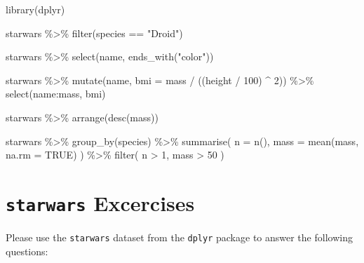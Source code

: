 \documentclass[
]{book}
\newenvironment{Shaded}{\begin{snugshade}}{\end{snugshade}}
\newcommand{\AttributeTok}[1]{\textcolor[rgb]{0.77,0.63,0.00}{#1}}
\newcommand{\ConstantTok}[1]{\textcolor[rgb]{0.00,0.00,0.00}{#1}}
\newcommand{\DecValTok}[1]{\textcolor[rgb]{0.00,0.00,0.81}{#1}}
\newcommand{\FunctionTok}[1]{\textcolor[rgb]{0.00,0.00,0.00}{#1}}
\newcommand{\NormalTok}[1]{#1}
\newcommand{\SpecialCharTok}[1]{\textcolor[rgb]{0.00,0.00,0.00}{#1}}
\newcommand{\StringTok}[1]{\textcolor[rgb]{0.31,0.60,0.02}{#1}}
\begin{document}
\begin{Shaded}
\begin{Highlighting}[]
\FunctionTok{library}\NormalTok{(dplyr)}

\NormalTok{starwars }\SpecialCharTok{\%\textgreater{}\%} 
  \FunctionTok{filter}\NormalTok{(species }\SpecialCharTok{==} \StringTok{"Droid"}\NormalTok{)}


\NormalTok{starwars }\SpecialCharTok{\%\textgreater{}\%} 
  \FunctionTok{select}\NormalTok{(name, }\FunctionTok{ends\_with}\NormalTok{(}\StringTok{"color"}\NormalTok{))}


\NormalTok{starwars }\SpecialCharTok{\%\textgreater{}\%} 
  \FunctionTok{mutate}\NormalTok{(name, }\AttributeTok{bmi =}\NormalTok{ mass }\SpecialCharTok{/}\NormalTok{ ((height }\SpecialCharTok{/} \DecValTok{100}\NormalTok{)  }\SpecialCharTok{\^{}} \DecValTok{2}\NormalTok{)) }\SpecialCharTok{\%\textgreater{}\%}
  \FunctionTok{select}\NormalTok{(name}\SpecialCharTok{:}\NormalTok{mass, bmi)}


\NormalTok{starwars }\SpecialCharTok{\%\textgreater{}\%} 
  \FunctionTok{arrange}\NormalTok{(}\FunctionTok{desc}\NormalTok{(mass))}

\NormalTok{starwars }\SpecialCharTok{\%\textgreater{}\%}
  \FunctionTok{group\_by}\NormalTok{(species) }\SpecialCharTok{\%\textgreater{}\%}
  \FunctionTok{summarise}\NormalTok{(}
    \AttributeTok{n =} \FunctionTok{n}\NormalTok{(),}
    \AttributeTok{mass =} \FunctionTok{mean}\NormalTok{(mass, }\AttributeTok{na.rm =} \ConstantTok{TRUE}\NormalTok{)}
\NormalTok{  ) }\SpecialCharTok{\%\textgreater{}\%}
  \FunctionTok{filter}\NormalTok{(}
\NormalTok{    n }\SpecialCharTok{\textgreater{}} \DecValTok{1}\NormalTok{,}
\NormalTok{    mass }\SpecialCharTok{\textgreater{}} \DecValTok{50}
\NormalTok{  )}
\end{Highlighting}
\end{Shaded}

\hypertarget{starwars-excercises}{%
\section{\texorpdfstring{\texttt{starwars} Excercises}{starwars Excercises}}\label{starwars-excercises}}

Please use the \texttt{starwars} dataset from the \texttt{dplyr} package to answer the following questions:
\end{document}
